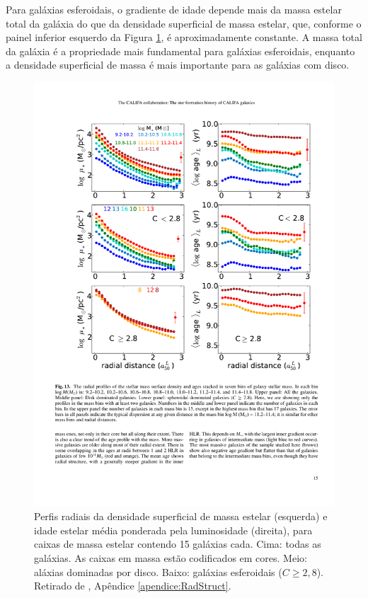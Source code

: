 Para galáxias esferoidais, o gradiente de idade depende mais da massa estelar
total da galáxia do que da densidade superficial de massa estelar, que, conforme
o painel inferior esquerdo da Figura \ref{fig:radStruct3}, é aproximadamente
constante. A massa total da galáxia é a propriedade mais fundamental para
galáxias esferoidais, enquanto a densidade superficial de massa é mais
importante para as galáxias com disco.


\begin{figure}
	\includegraphics[width=0.8\columnwidth]{figuras/radstruct-03}
	\caption[Perfis radiais para várias caixas de massa estelar.]
	{Perfis radiais da densidade superficial de massa estelar (esquerda) e idade
	estelar média ponderada pela luminosidade (direita), para caixas de
	massa estelar contendo 15 galáxias cada. Cima: todas as galáxias. As caixas
	em massa estão codificados em cores. Meio: aláxias dominadas por disco.
	Baixo: galáxias esferoidais ($C \geq 2,8$). Retirado de \citet[figura
	13]{GonzalezDelgado2014a}, Apêndice \ref{apendice:RadStruct}.}
	\label{fig:radStruct3}
\end{figure}


